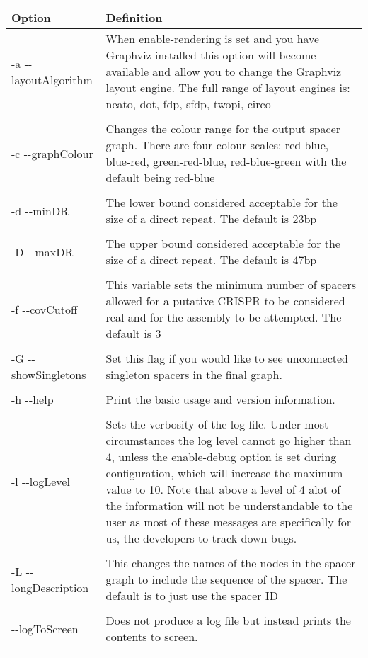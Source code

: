 \documentclass[11pt]{article} %
\begin{document}
    \begin{longtable}{  l   p{10cm} }
    \hline
    Option & Definition \\  \hline\hline
    -a  -{}-layoutAlgorithm &   When enable-rendering is set and you have Graphviz installed this option will become available and allow you to change the Graphviz layout engine.  The full range of layout engines is: neato, dot, fdp, sfdp, twopi, circo \\ \\
-c -{}-graphColour & Changes the colour range for the output spacer graph.  There are four colour scales: red-blue, blue-red, green-red-blue, red-blue-green with the default being red-blue\\ \\
-d -{}-minDR & The lower bound considered acceptable for the size of a direct repeat.  The default is 23bp\\ \\
-D -{}-maxDR & The upper bound considered acceptable for the size of a direct repeat. The default is 47bp\\ \\
-f -{}-covCutoff & This variable sets the minimum number of spacers allowed for a putative CRISPR to be considered real and for the assembly to be attempted.  The default is 3  \\ \\
-G -{}-showSingletons & Set this flag if you would like to see unconnected singleton spacers in the final graph.\\ \\
-h -{}-help & Print the basic usage and version information. \\ \\

-l -{}-logLevel & Sets the verbosity of the log file.  Under most circumstances the log level cannot go higher than 4, unless the enable-debug option is set during configuration, which will increase the maximum value to 10.  Note that above a level of 4 alot of the information will not be understandable to the user as most of these messages are specifically for us, the developers to track down bugs.  \\ \\
-L -{}-longDescription & This changes  the names of the nodes in the spacer graph to include the sequence of the spacer.  The default is to just use the spacer ID\\ \\
-{}-logToScreen & Does not produce a log file but instead prints the contents to screen.\\ \\


\end{longtable}
\end{document}

